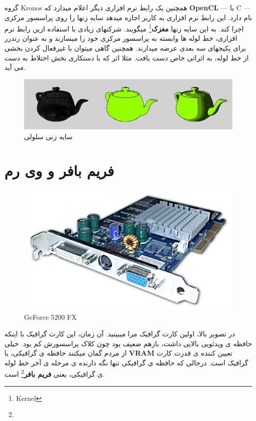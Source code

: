 \documentclass[14pt,a4paper]{memoir}
\begin{document}
	 
	 گروه Kronos همچنین یک رابط نرم افزاری دیگر اعلام میدارد که \textbf{OpenCL} --- با C --- نام دارد. این رابط نرم افزاری به کاربر اجازه میدهد سایه زنها را روی پراسسور مرکزی اجرا کند. به این سایه زنها \textbf{مغزک}\footnote{Kernel} میگویند. شرکتهای زیادی با استفاده ازین رابط نرم افزاری، خط لوله ها وابسته به پراسسور مرکزی خود را میسازند و به عنوان رندرر برای پکیجهای سه بعدی عرضه میدارند. همچنین گاهی میتوان با غیرفعال کردن بخشی از خط لوله، به اثراتی خاص دست یافت. مثلا اثر  که با دستکاری بخش اختلاط به دست می آید.
	 
	\begin{figure}[H]
		\centering
		\includegraphics[scale=0.3]{Cel}
		\caption{سایه زنی سلولی}
	\end{figure}
	 
	 
	 \section{فریم بافر و وی رم}\label{vram}
	 
	 
	 \begin{figure}[H]
	 	\centering
	 	\includegraphics[scale=0.3]{5200}
	 	\caption{GeForce 5200 FX}
	 \end{figure}
 
 در تصویر بالا، اولین کارت گرافیک مرا میبینید. آن زمان، این کارت گرافیک با اینکه حافظه ی ویدئویی بالایی داشت، بازهم ضعیف بود چون کلاک پراسسورش کم بود. خیلی از مردم گمان میکنند حافظه ی گرافیکی، یا \textbf{VRAM} تعیین کننده ی قدرت کارت گرافیک است. درحالی که حافظه ی گرافیکی تنها نگه دارنده ی مرحله ی آخر خط لوله ی گرافیکی، یعنی \textbf{فریم بافر}\footnote{} است.
 
\end{document}
